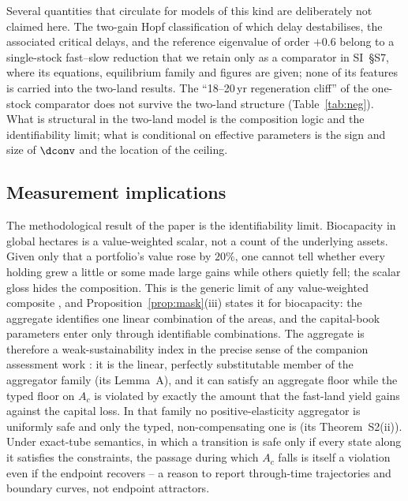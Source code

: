 Several quantities that circulate for models of this kind are deliberately not claimed here. The two-gain Hopf classification of which delay destabilises, the associated critical delays, and the reference eigenvalue of order $+0.6$ belong to a single-stock fast--slow reduction that we retain only as a comparator in SI~\S S7, where its equations, equilibrium family and figures are given; none of its features is carried into the two-land results. The ``18--20\,yr regeneration cliff'' of the one-stock comparator does not survive the two-land structure (Table~\ref{tab:neg}). What is structural in the two-land model is the composition logic and the identifiability limit; what is conditional on effective parameters is the sign and size of $\dconv$ and the location of the ceiling.

\subsection{Measurement implications}

The methodological result of the paper is the identifiability limit. Biocapacity in global hectares is a value-weighted scalar, not a count of the underlying assets. Given only that a portfolio's value rose by $20\%$, one cannot tell whether every holding grew a little or some made large gains while others quietly fell; the scalar gloss hides the composition. This is the generic limit of any value-weighted composite \citep{Nardo2008}, and Proposition~\ref{prop:mask}(iii) states it for biocapacity: the aggregate identifies one linear combination of the areas, and the capital-book parameters enter only through identifiable combinations. The aggregate is therefore a weak-sustainability index in the precise sense of the companion assessment work \citep{Abaee2026b}: it is the linear, perfectly substitutable member of the aggregator family (its Lemma~A), and it can satisfy an aggregate floor while the typed floor on $A_c$ is violated by exactly the amount that the fast-land yield gains against the capital loss. In that family no positive-elasticity aggregator is uniformly safe and only the typed, non-compensating one is (its Theorem~S2(ii)). Under exact-tube semantics, in which a transition is safe only if every state along it satisfies the constraints, the passage during which $A_c$ falls is itself a violation even if the endpoint recovers -- a reason to report through-time trajectories and boundary curves, not endpoint attractors.


